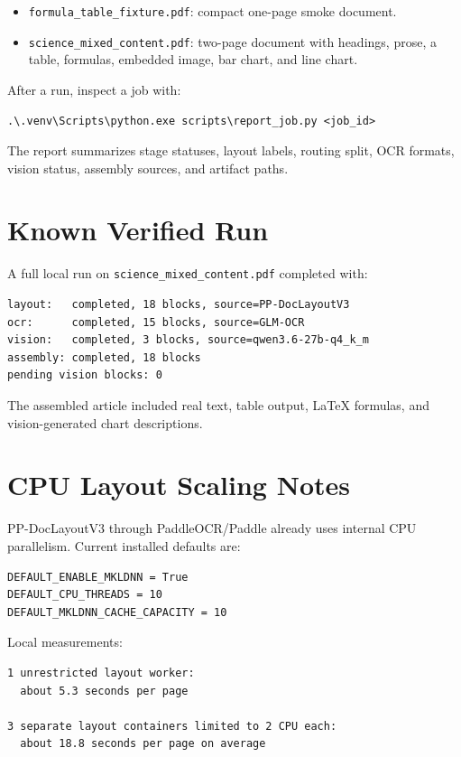 \documentclass[11pt,a4paper]{article}
\begin{document}
\begin{itemize}[leftmargin=1.2cm]
\item \texttt{formula\_table\_fixture.pdf}: compact one-page smoke document.
\item \texttt{science\_mixed\_content.pdf}: two-page document with headings,
  prose, a table, formulas, embedded image, bar chart, and line chart.
\end{itemize}

After a run, inspect a job with:

\begin{lstlisting}
.\.venv\Scripts\python.exe scripts\report_job.py <job_id>
\end{lstlisting}

The report summarizes stage statuses, layout labels, routing split, OCR
formats, vision status, assembly sources, and artifact paths.

\section{Known Verified Run}

A full local run on \texttt{science\_mixed\_content.pdf} completed with:

\begin{lstlisting}
layout:   completed, 18 blocks, source=PP-DocLayoutV3
ocr:      completed, 15 blocks, source=GLM-OCR
vision:   completed, 3 blocks, source=qwen3.6-27b-q4_k_m
assembly: completed, 18 blocks
pending vision blocks: 0
\end{lstlisting}

The assembled article included real text, table output, LaTeX formulas, and
vision-generated chart descriptions.

\section{CPU Layout Scaling Notes}

PP-DocLayoutV3 through PaddleOCR/Paddle already uses internal CPU
parallelism. Current installed defaults are:

\begin{lstlisting}
DEFAULT_ENABLE_MKLDNN = True
DEFAULT_CPU_THREADS = 10
DEFAULT_MKLDNN_CACHE_CAPACITY = 10
\end{lstlisting}

Local measurements:

\begin{lstlisting}
1 unrestricted layout worker:
  about 5.3 seconds per page

3 separate layout containers limited to 2 CPU each:
  about 18.8 seconds per page on average
\end{lstlisting}
\end{document}
